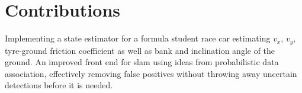 \section{Contributions}
Implementing a state estimator for a formula student race car estimating $v_x$, $v_y$, tyre-ground friction coefficient as well as bank and inclination angle of the ground. An improved front end for slam using ideas from probabilistic data association, effectively removing false positives without throwing away uncertain detections before it is needed.